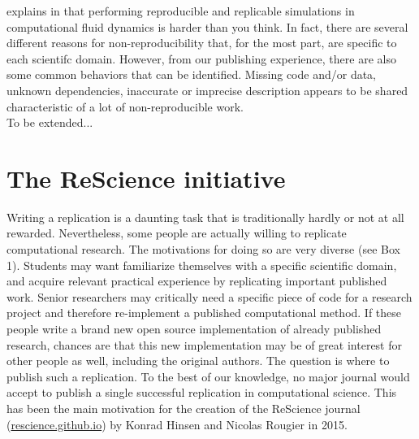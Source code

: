 \documentclass[a4paper,10pt, twocolumn]{article}
\begin{document}
\citeauthor{Mesnard:2016} explains in \citep{Mesnard:2016} that performing
reproducible and replicable simulations in computational fluid dynamics is harder
than you think. In fact, there are several different reasons for
non-reproducibility that, for the most part, are specific to each
scientifc domain. However, from our publishing experience, there are also some
common behaviors that can be identified. Missing code and/or data, unknown
dependencies, inaccurate or imprecise description appears to be shared
characteristic of a lot of non-reproducible work.\\

To be extended...

\section*{The ReScience initiative}

Writing a replication is a daunting task that is traditionally hardly or not
at all rewarded. Nevertheless, some people are actually willing to replicate
computational research. The motivations for doing so are very diverse (see Box 1). Students may want familiarize themselves with
a specific scientific domain, and acquire relevant practical experience by replicating important published work. Senior researchers may critically
need a specific piece of code for a research project and therefore re-implement a published computational method. If these people write a brand new
open source implementation of already published research, chances are that this new
implementation may be of great interest for other people as well, including
the original authors. The question is where to publish such a replication. To the
best of our knowledge, no major journal would accept to publish a single successful
replication in computational science. This has been the main motivation for the
creation of the ReScience journal (\url{rescience.github.io}) by Konrad Hinsen
and Nicolas Rougier in 2015.\\
\end{document}
